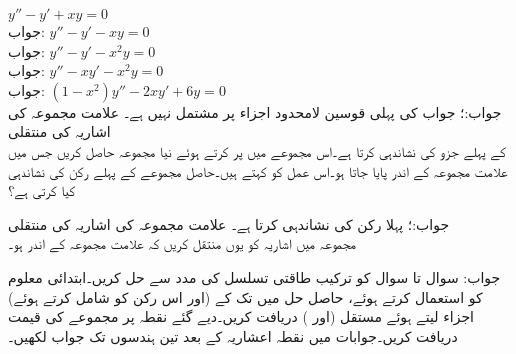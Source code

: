 \quad
$y''-y'+xy=0$\\
جواب:
\quad
$y''-y'-xy=0$\\
جواب:
\quad
$y''-y'-x^2y=0$\\
جواب:
\quad
$y''-xy'-x^2y=0$\\
جواب:
\quad
$(1-x^2)y''-2xy'+6y=0$\\
جواب:؛ جواب کی پہلی قوسین لامحدود اجزاء پر مشتمل نہیں ہے۔ 
\quad علامت مجموعہ کی اشاریہ کی منتقلی\\
 کے پہلے جزو کی نشاندہی  کرتا ہے۔اس مجموعے  میں  پر کرتے ہوئے نیا مجموعہ حاصل کریں جس میں علامت مجموعہ کے اندر  پایا جاتا ہو۔اس عمل کو  کہتے ہیں۔حاصل مجموعے کے پہلے رکن کی نشاندہی کیا کرتی ہے؟

جواب:؛ پہلا رکن کی نشاندہی  کرتا ہے۔
\quad علامت مجموعہ کی اشاریہ کی منتقلی\\
مجموعہ  میں اشاریہ کو یوں منتقل کریں کہ علامت مجموعہ کے اندر  ہو۔

جواب:
سوال  تا سوال  کو ترکیب طاقتی تسلسل کی مدد سے حل کریں۔ابتدائی معلوم کو استعمال کرتے ہوئے، حاصل حل میں  تک کے (اور اس رکن کو شامل کرتے ہوئے) اجزاء لیتے ہوئے  مستقل  (اور ) دریافت کریں۔دیے گئے نقطہ  پر مجموعے کی قیمت دریافت کریں۔جوابات میں نقطہ اعشاریہ کے بعد تین ہندسوں تک جواب لکھیں۔

